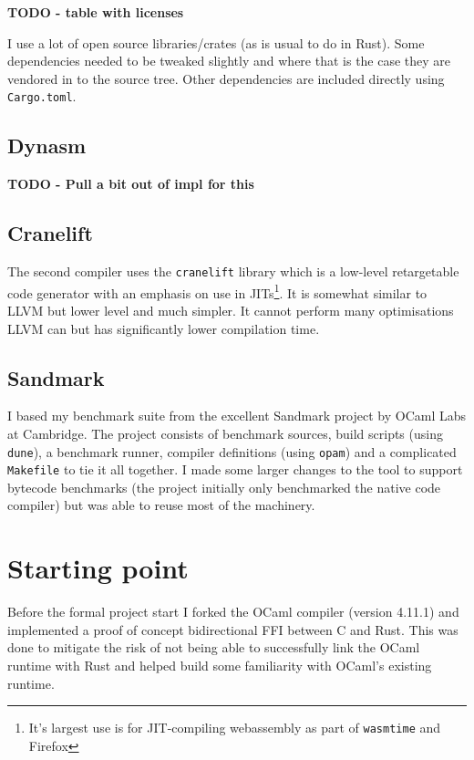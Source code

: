 \textbf{TODO - table with licenses}

I use a lot of open source libraries/crates (as is usual to do in Rust). Some dependencies needed
to be tweaked slightly and where that is the case they are vendored in to the source tree. Other
dependencies are included directly using \texttt{Cargo.toml}.

\subsection{Dynasm}

\textbf{TODO - Pull a bit out of impl for this}

\subsection{Cranelift}

The second compiler uses the \texttt{cranelift} \cite{cranelift} library which is a low-level
retargetable
code generator with an emphasis on use in JITs\footnote{It's largest use is for JIT-compiling
    webassembly as part of \texttt{wasmtime} and Firefox}. It is somewhat similar to LLVM but
lower
level and much simpler. It cannot perform many optimisations LLVM can but has significantly lower
compilation time.

\subsection{Sandmark}

I based my benchmark suite from the excellent Sandmark project by OCaml Labs at Cambridge. The
project consists of benchmark sources, build scripts (using \texttt{dune}), a benchmark runner,
compiler definitions (using \texttt{opam}) and a complicated \texttt{Makefile} to tie it all
together.  I made some larger changes to the tool to support bytecode benchmarks (the project
initially only benchmarked the native code compiler) but was able to reuse most of the machinery.

\section{Starting point}

Before the formal project start I forked the OCaml compiler (version 4.11.1) and implemented a
proof
of concept bidirectional FFI between C and Rust. This was done to mitigate the risk of not being
able to successfully link the OCaml runtime with Rust and helped build some familiarity with
OCaml's
existing runtime.

